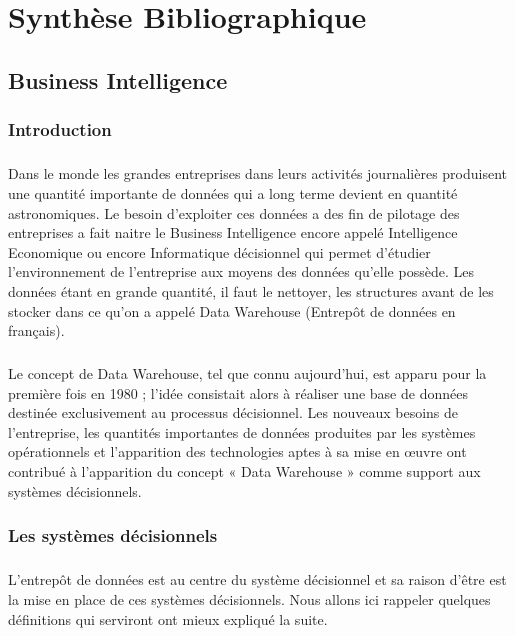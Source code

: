 \chapter{Synthèse Bibliographique}

\section{Business Intelligence}
	\subsection{Introduction}
  		\paragraph{}
  		Dans le monde les grandes entreprises dans leurs activités journalières produisent une quantité importante de données qui a long terme devient en quantité astronomiques. Le besoin d’exploiter ces données a des fin de pilotage des entreprises a fait naitre le Business Intelligence encore appelé Intelligence Economique ou encore Informatique décisionnel qui permet d’étudier l’environnement de l’entreprise aux moyens des données qu’elle possède. Les données étant en grande quantité, il faut le nettoyer, les structures avant de les stocker dans ce qu’on a appelé Data Warehouse (Entrepôt de données en français).
  
  		\paragraph{}
  Le concept de Data Warehouse, tel que connu aujourd’hui, est apparu pour la première  fois en 1980 ; l’idée consistait alors à réaliser une base de données destinée exclusivement au processus décisionnel. Les nouveaux besoins de l’entreprise, les quantités importantes de données produites par les systèmes opérationnels et l’apparition des technologies aptes à sa mise en œuvre ont contribué à l’apparition du concept « Data Warehouse » comme support aux systèmes décisionnels.
  
  
	\subsection{Les systèmes décisionnels}
  		\paragraph{}
  L’entrepôt de données est au centre du système décisionnel et sa raison d’être est la mise en place de ces systèmes décisionnels. Nous allons ici rappeler quelques définitions qui serviront ont mieux expliqué la suite.
